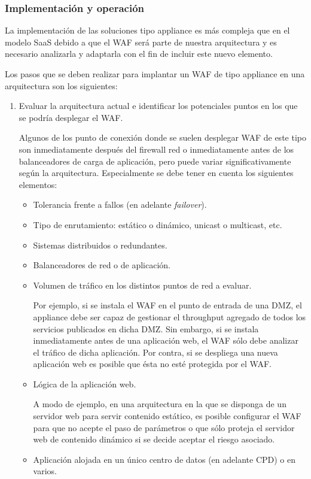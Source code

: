 \subsubsection{Implementación y operación}
\par La implementación de las soluciones tipo appliance es más compleja que en el modelo SaaS debido a que el WAF será parte de nuestra
arquitectura y es necesario analizarla y adaptarla con el fin de incluir este nuevo elemento.
\par Los pasos que se deben realizar para implantar un WAF de tipo appliance en una arquitectura son los siguientes:

\begin{enumerate}
  \item Evaluar la arquitectura actual e identificar los potenciales puntos en los que se podría desplegar el WAF.
    \par Algunos de los punto de conexión donde se suelen desplegar WAF de este tipo son inmediatamente después del firewall red o
    inmediatamente antes de los balanceadores de carga de aplicación, pero puede variar significativamente según la arquitectura. Especialmente se debe
    tener en cuenta los siguientes elementos:
    \begin{itemize}
      \item Tolerancia frente a fallos (en adelante {\em failover}).
      \item Tipo de enrutamiento: estático o dinámico, unicast o multicast, etc.
      \item Sistemas distribuidos o redundantes.
      \item Balanceadores de red o de aplicación.
      \item Volumen de tráfico en los distintos puntos de red a evaluar.
        \par Por ejemplo, si se instala el WAF en el punto de entrada de una DMZ, el appliance debe ser capaz de gestionar el throughput
        agregado de todos los servicios publicados en dicha DMZ. Sin embargo, si se instala inmediatamente antes de una aplicación web, el WAF
        sólo debe analizar el tráfico de dicha aplicación. Por contra, si se despliega una nueva aplicación web es posible que ésta no esté
        protegida por el WAF.
      \item Lógica de la aplicación web.
        \par A modo de ejemplo, en una arquitectura en la que se disponga de un  servidor web para servir contenido estático, es posible
        configurar el WAF para que no acepte el paso de parámetros o que sólo proteja el servidor web de contenido dinámico si se decide
        aceptar el riesgo asociado.
      \item Aplicación alojada en un único centro de datos (en adelante CPD) o en varios.
    \end{itemize}


\end{enumerate}
